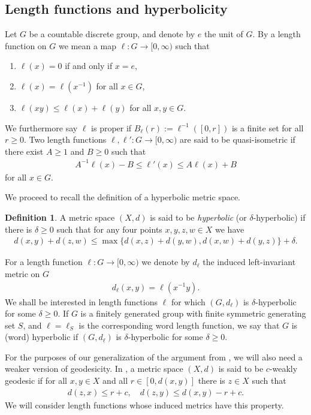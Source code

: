 \documentclass[12pt,a4paper,oneside,final,reqno]{amsart}
\theoremstyle{plain}
\theoremstyle{definition}
\newtheorem{definition}[theorem]{Definition}
\begin{document}
\subsection{Length functions and hyperbolicity}
Let $G$ be a countable discrete group, and denote by $e$ the unit of $G$. By a length function on $G$ we mean a map $\ell \colon G \to [0,\infty)$ such that
\begin{enumerate}
    \item $\ell(x) = 0$ if and only if $x = e$, 
    \item $\ell(x) = \ell(x^{-1})$ for all $x \in G$, 
    \item $\ell(xy) \leq \ell(x) + \ell(y)$ for all $x,y \in G$.
\end{enumerate}
We furthermore say $\ell$ is proper if $B_\ell(r) := \ell^{-1}([0,r])$ is a finite set for all $ r \geq 0$. Two length functions $\ell, \ell' \colon G \to [0,\infty)$ are said to be quasi-isometric if there exist $A \geq 1$ and $B \geq 0$ such that
\begin{align*}
    A^{-1} \ell(x) -B \leq \ell' (x) \leq A \ell(x) + B
\end{align*}
for all $x \in G$. 

We proceed to recall the definition of a hyperbolic metric space.
\begin{definition}\label{def:hyperbolic-metric-space}
    A metric space $(X,d)$ is said to be \emph{hyperbolic} (or $\delta$-hyperbolic) if there is $\delta \geq 0$ such that for any four points $x,y,z,w \in X$ we have
    \begin{align*}
        d(x,y) + d(z,w) \leq \max \{ d(x,z) + d(y,w), d(x,w) + d(y,z) \} + \delta .
    \end{align*}
\end{definition}
%
For a length function $\ell \colon G \to [0,\infty)$ we denote by $d_\ell$ the induced left-invariant metric on $G$
\begin{align*}
    d_\ell(x,y) = \ell(x^{-1}y).
\end{align*}
We shall be interested in length functions $\ell$ for which $(G, d_\ell)$ is $\delta$-hyperbolic for some $\delta \geq 0$. If $G$ is a finitely generated group with finite symmetric generating set $S$, and $\ell = \ell_S$ is the corresponding word length function, we say that $G$ is (word) hyperbolic if $(G, d_\ell)$ is $\delta$-hyperbolic for some $\delta \geq 0$.

For the purposes of our generalization of the argument from \cite[Proposition 4.3]{OzawaRieffel2005}, we will also need a weaker version of geodesicity. In \cite[Definition 2.1]{KasparovSkandalis2003}, a metric space $(X,d)$ is said to be $c$-weakly geodesic if for all $x,y \in X$ and all $r \in [0,d(x,y)]$ there is $z \in X$ such that
\begin{align*}
    d(z,x) \leq r +c, \quad d(z,y) \leq d(x,y) - r + c.
\end{align*}
We will consider length functions whose induced metrics have this property. 
\end{document}
